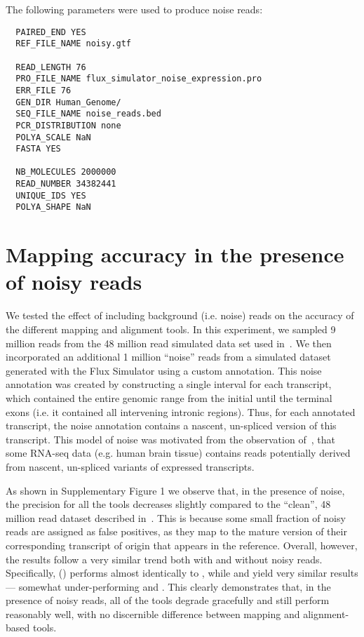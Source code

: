 The following parameters were used to produce noise reads:	

\begin{verbatim}
  PAIRED_END YES
  REF_FILE_NAME noisy.gtf
	
  READ_LENGTH 76
  PRO_FILE_NAME flux_simulator_noise_expression.pro
  ERR_FILE 76
  GEN_DIR Human_Genome/
  SEQ_FILE_NAME noise_reads.bed
  PCR_DISTRIBUTION none
  POLYA_SCALE NaN 
  FASTA YES 
	
  NB_MOLECULES 2000000
  READ_NUMBER 34382441
  UNIQUE_IDS YES 
  POLYA_SHAPE NaN                                                                               
\end{verbatim}

\section{Mapping accuracy in the presence of noisy reads}
\label{subsec:noise}

\begin{figure*}[htb] \centering \texttt{[image: \{Avi.RPE.supfig.1]}.pdf}
\caption{Precision, recall and F1-score (top) and FDR (bottom) on the simulated dataset with noise, for the 4 different tools we consider.}
\label{fig:noisy_read} 
\end{figure*}

We tested the effect of including background (i.e. noise) reads on the accuracy of the different mapping and alignment tools.  In this experiment, we sampled 9 million reads from the 48 million read simulated data set used in~. We then incorporated an additional 1 million ``noise'' reads from a simulated dataset generated with the Flux Simulator using a custom annotation. This noise annotation was created by constructing a single interval for each transcript, which contained the entire genomic range from the initial until the terminal exons (i.e. it contained all intervening intronic regions).  Thus, for each annotated transcript, the noise annotation contains a nascent, un-spliced version of this transcript. This model of noise was motivated from the observation of~\citep{gilbert2004elongator}, that some RNA-seq data (e.g. human brain tissue) contains reads potentially derived from nascent, un-spliced variants of expressed transcripts. 

As shown in Supplementary Figure 1 we observe that, in the presence of noise, the precision for all the tools decreases slightly compared to the ``clean'', 48 million read dataset described in~. This is because some small fraction of noisy reads are assigned as false positives, as they map to the mature version of their corresponding transcript of origin that appears in the reference. Overall, however, the results follow a very similar trend both with and without noisy reads.  Specifically, \rapmap (\qm) performs almost identically to \bt, while \kallisto and \STAR yield very similar results --- somewhat under-performing \rapmap and \bt.  This clearly demonstrates that, in the presence of noisy reads, all of the tools degrade gracefully and still perform reasonably well, with no discernible difference between mapping and alignment-based tools.

